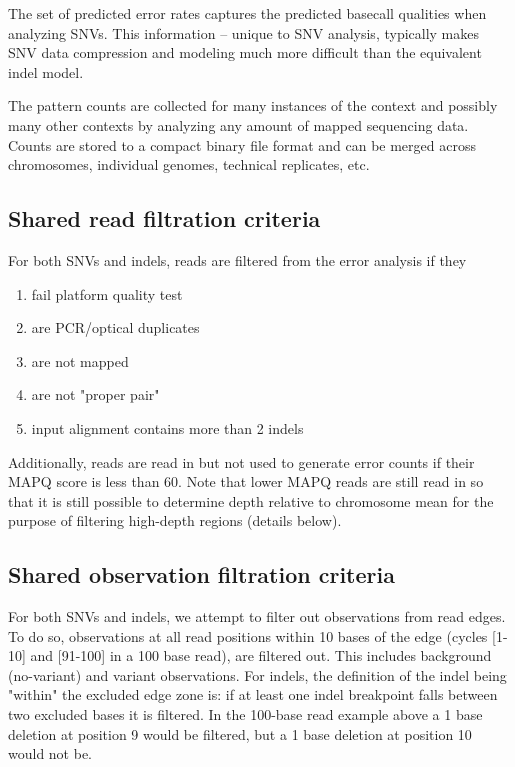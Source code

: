 \documentclass{article}
\begin{document}
The set of predicted error rates captures the predicted basecall qualities when analyzing SNVs. This information -- unique to SNV analysis, typically makes SNV data compression and modeling much more difficult than the equivalent indel model.

The pattern counts are collected for many instances of the context and possibly many other contexts by analyzing any amount of mapped sequencing data. Counts are stored to a compact binary file format and can be merged across chromosomes, individual genomes, technical replicates, etc.

\subsection{Shared read filtration criteria}

For both SNVs and indels, reads are filtered from the error analysis if they

\begin{enumerate}
\item fail platform quality test
\item are PCR/optical duplicates
\item are not mapped
\item are not "proper pair"
\item input alignment contains more than 2 indels
\end{enumerate}

Additionally, reads are read in but not used to generate error counts if their MAPQ score is less than 60. Note that lower MAPQ reads are still read in so that it is still possible to determine depth relative to chromosome mean for the purpose of filtering high-depth regions (details below).

\subsection{Shared observation filtration criteria}

For both SNVs and indels, we attempt to filter out observations from read edges. To do so, observations at all read positions within 10 bases of the edge (cycles [1-10] and [91-100] in a 100 base read), are filtered out. This includes background (no-variant) and variant observations. For indels, the definition of the indel being "within" the excluded edge zone is: if at least one indel breakpoint falls between two excluded bases it is filtered. In the 100-base read example above a 1 base deletion at position 9 would be filtered, but a 1 base deletion at position 10 would not be.
\end{document}
